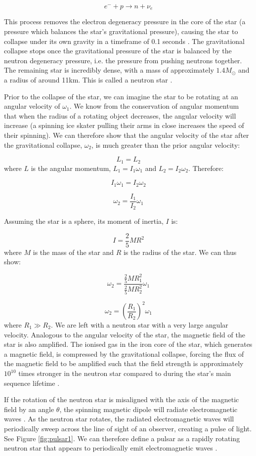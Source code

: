 \documentclass{article}
\begin{document}
$$ e^{-}+p\rightarrow n + \nu_e$$

This process removes the electron degeneracy pressure in the core of the star (a pressure which balances the star's gravitational pressure), causing the star to collapse under its own gravity in a timeframe of 0.1 seconds \autocite{maoz}. The gravitational collapse stops once the gravitational pressure of the star is balanced by the neutron degeneracy pressure, i.e. the pressure from pushing neutrons together. The remaining star is incredibly dense, with a mass of approximately $1.4M_{\odot}$ and a radius of around 11km. This is called a neutron star \autocite{maoz}.

Prior to the collapse of the star, we can imagine the star to be rotating at an angular velocity of $\omega_1$. We know from the conservation of angular momentum that when the radius of a rotating object decreases, the angular velocity will increase (a spinning ice skater pulling their arms in close increases the speed of their spinning). We can therefore show that the angular velocity of the star after the gravitational collapse, $\omega_2$, is much greater than the prior angular velocity:

$$L_1 = L_2$$ where $L$ is the angular momentum, $L_1=I_1\omega_1$ and $L_2=I_2\omega_2$. Therefore:

$$ I_1 \omega_1 = I_2 \omega_2 $$

$$\omega_2 = \frac{I_1}{I_2}\omega_1$$

Assuming the star is a sphere, its moment of inertia, $I$ is:

$$I = \frac{2}{5}MR^2$$ where $M$ is the mass of the star and $R$ is the radius of the star. We can thus show:

$$\omega_2 = \frac{\frac{2}{5}MR_1^2}{\frac{2}{5}MR_2^2}\omega_1$$

$$\omega_2 = \left(\frac{R_1}{R_2}\right)^2\omega_1$$ where $R_1 \gg R_2$. We are left with a neutron star with a very large angular velocity. Analogous to the angular velocity of the star, the magnetic field of the star is also amplified. The ionised gas in the iron core of the star, which generates a magnetic field, is compressed by the gravitational collapse, forcing the flux of the magnetic field to be amplified such that the field strength is approximately $10^{10}$ times stronger in the neutron star compared to during the star's main sequence lifetime \autocite{maoz}.

If the rotation of the neutron star is misaligned with the axis of the magnetic field by an angle $\theta$, the spinning magnetic dipole will radiate electromagnetic waves \autocite{maoz}. As the neutron star rotates, the radiated electromagnetic waves will periodically sweep across the line of sight of an observer, creating a pulse of light. See Figure \ref{fig:pulsar1}. We can therefore define a pulsar as a rapidly rotating neutron star that appears to periodically emit electromagnetic waves \autocite{maoz,lorimer,swainston}.
\end{document}
